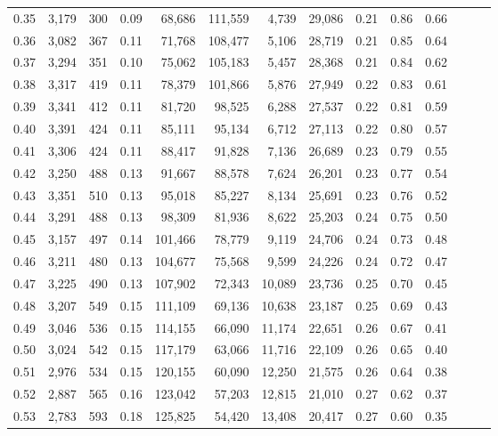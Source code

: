 \begin{tabular}{rrrrrrrrrrrrrr}
0.35 &  3,179 &    300 &  0.09 &   68,686 &  111,559 &   4,739 &  29,086 &  0.21 &  0.86 &      0.66 \\
0.36 &  3,082 &    367 &  0.11 &   71,768 &  108,477 &   5,106 &  28,719 &  0.21 &  0.85 &      0.64 \\
0.37 &  3,294 &    351 &  0.10 &   75,062 &  105,183 &   5,457 &  28,368 &  0.21 &  0.84 &      0.62 \\
0.38 &  3,317 &    419 &  0.11 &   78,379 &  101,866 &   5,876 &  27,949 &  0.22 &  0.83 &      0.61 \\
0.39 &  3,341 &    412 &  0.11 &   81,720 &   98,525 &   6,288 &  27,537 &  0.22 &  0.81 &      0.59 \\
0.40 &  3,391 &    424 &  0.11 &   85,111 &   95,134 &   6,712 &  27,113 &  0.22 &  0.80 &      0.57 \\
0.41 &  3,306 &    424 &  0.11 &   88,417 &   91,828 &   7,136 &  26,689 &  0.23 &  0.79 &      0.55 \\
0.42 &  3,250 &    488 &  0.13 &   91,667 &   88,578 &   7,624 &  26,201 &  0.23 &  0.77 &      0.54 \\
0.43 &  3,351 &    510 &  0.13 &   95,018 &   85,227 &   8,134 &  25,691 &  0.23 &  0.76 &      0.52 \\
0.44 &  3,291 &    488 &  0.13 &   98,309 &   81,936 &   8,622 &  25,203 &  0.24 &  0.75 &      0.50 \\
0.45 &  3,157 &    497 &  0.14 &  101,466 &   78,779 &   9,119 &  24,706 &  0.24 &  0.73 &      0.48 \\
0.46 &  3,211 &    480 &  0.13 &  104,677 &   75,568 &   9,599 &  24,226 &  0.24 &  0.72 &      0.47 \\
0.47 &  3,225 &    490 &  0.13 &  107,902 &   72,343 &  10,089 &  23,736 &  0.25 &  0.70 &      0.45 \\
0.48 &  3,207 &    549 &  0.15 &  111,109 &   69,136 &  10,638 &  23,187 &  0.25 &  0.69 &      0.43 \\
0.49 &  3,046 &    536 &  0.15 &  114,155 &   66,090 &  11,174 &  22,651 &  0.26 &  0.67 &      0.41 \\
0.50 &  3,024 &    542 &  0.15 &  117,179 &   63,066 &  11,716 &  22,109 &  0.26 &  0.65 &      0.40 \\
0.51 &  2,976 &    534 &  0.15 &  120,155 &   60,090 &  12,250 &  21,575 &  0.26 &  0.64 &      0.38 \\
0.52 &  2,887 &    565 &  0.16 &  123,042 &   57,203 &  12,815 &  21,010 &  0.27 &  0.62 &      0.37 \\
0.53 &  2,783 &    593 &  0.18 &  125,825 &   54,420 &  13,408 &  20,417 &  0.27 &  0.60 &      0.35 \\

\end{tabular}
